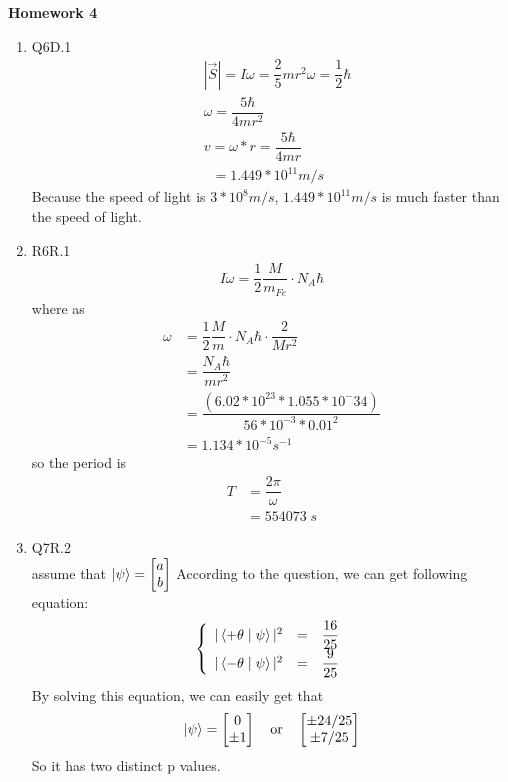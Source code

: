 \documentclass{article}
\providecommand{\Matrix}[1] {\begin{bmatrix} #1 \end{bmatrix}}
\theoremstyle{definition}
\theoremstyle{plain}
\begin{document}
\begin{center} \bf \LARGE Homework 4\\
\end{center}


\begin {enumerate}[itemindent=30pt,label=\bf Exercise {\arabic*}:]

\item Q6D.1\\
\begin{align*}
	&|\vec{S}| = I \omega = \dfrac{2}{5} m r^{2} \omega = \dfrac{1}{2} \hbar \\
	&\omega = \dfrac{5 \hbar}{4 m r^{2}} \\
	&v = \omega * r =   \dfrac{5 \hbar}{4 m r} \\
	&\;\; = 1.449*10^{11} m/s
\end{align*}
\subitem Because the speed of light is $3*10^{8} m/s$, $1.449*10^{11}m/s$ is much faster than the speed of light.
\item R6R.1\\
\begin{align*}
	I\omega =  \dfrac{1}{2} \dfrac{M}{m_{Fe}} \cdot N_{A} \hbar
\end{align*}
\subitem where as 
\begin{align*}
	\omega &=  \dfrac{1}{2} \dfrac{M}{m} \cdot N_{A} \hbar \cdot \dfrac{2}{Mr^{2}}\\
		   &= \dfrac{N_{A} \hbar}{mr^{2}}\\
		   &= \dfrac{(6.02*10^23 * 1.055*10^-34)}{56 *10 ^{-3} *  0.01^{2}}\\
		   &= 1.134 * 10^{-5} s^{-1} 
\end{align*}
\subitem so the period is 
\begin{align*}
	T &= \dfrac{2\pi}{\omega} \\
	  &= 554073\;s
\end{align*}
\item Q7R.2 \\
\subitem assume that $\Ket{\psi} = \Matrix{a \\ b}$ 
\subitem According to the question, we can get following equation:
\begin{eqnarray*}     
\left\{                        
\begin{array}{lll}       
	|\Braket{+\theta \mid \psi}|^2 &=& \dfrac{16}{25} \\  
	|\Braket{-\theta \mid \psi}|^2 &=& \dfrac{9}{25} \\  
\end{array}
\right.                       
\end{eqnarray*}        
\subitem By solving this equation, we can easily get that
	$$ \Ket{\psi} = \Matrix{0 \\ \pm 1} \quad \mathrm{or} \quad \Matrix{\pm 24/25 \\ \pm 7/25}$$
\subitem So it has two distinct p values.\\


\end{enumerate}
\end{document}
